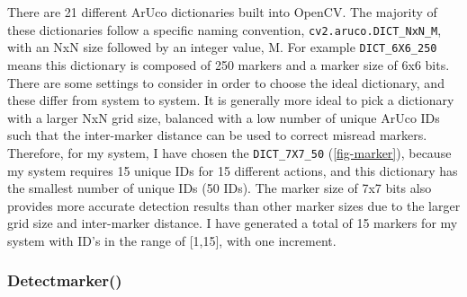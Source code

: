 \documentclass[oneside,%
                    author={Malak Hajji},
                    degree={BSc},
                    title={Designing An Accessible Computational Toolkit For Students},
                  subtitle={With Mixed Visual Abilities}]{dissertation}
\begin{document}
There are 21 different ArUco dictionaries built into OpenCV. The majority of these dictionaries follow a specific naming convention, \texttt{cv2.aruco.DICT\_NxN\_M}, with an NxN size followed by an integer value, M. For example \texttt{DICT\_6X6\_250} means this dictionary is composed of 250 markers and a marker size of 6x6 bits. There are some settings to consider in order to choose the ideal dictionary, and these differ from system to system. It is generally more ideal to pick a dictionary with a larger NxN grid size, balanced with a low number of unique ArUco IDs such that the inter-marker distance can be used to correct misread markers\cite{opencv-aruco}.
Therefore, for my system, I have chosen the \texttt{DICT\_7X7\_50} (\ref{fig-marker}), because my system requires 15 unique IDs for 15 different actions, and this dictionary has the smallest number of unique IDs (50 IDs). The marker size of 7x7 bits also provides more accurate detection results than other marker sizes due to the larger grid size and inter-marker distance. 
I have generated a total of 15 markers for my system with ID’s in the range of [1,15], with one increment. 

\subsubsection{Detectmarker()}
\end{document}
